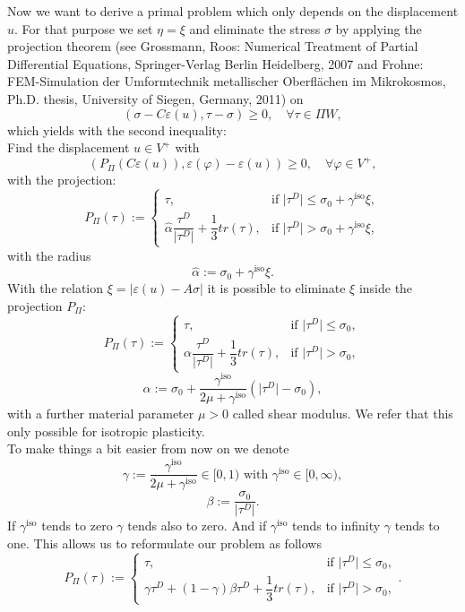\documentclass{article}
\begin{document}
Now we want to derive a primal problem which only depends on the displacement $u$. For that purpose we
set $\eta = \xi$ and eliminate the stress $\sigma$ by applying the projection
theorem (see Grossmann, Roos: Numerical Treatment of Partial Differential
Equations, Springer-Verlag Berlin Heidelberg, 2007 and Frohne: FEM-Simulation
der Umformtechnik metallischer Oberflächen im Mikrokosmos, Ph.D. thesis,
University of Siegen, Germany, 2011) on\\
$$\left(\sigma - C\varepsilon(u), \tau - \sigma\right) \geq 0,\quad \forall \tau\in \Pi W,$$
which yields with the second inequality:\\
Find the displacement $u\in V^+$ with
$$\left(P_{\Pi}(C\varepsilon(u)),\varepsilon(\varphi) - \varepsilon(u)\right) \geq 0,\quad \forall \varphi\in V^+,$$
with the projection:
$$P_{\Pi}(\tau):=\begin{cases}
			\tau, & \text{if }\vert\tau^D\vert \leq \sigma_0 +  \gamma^{\text{iso}}\xi,\\
			\hat\alpha\dfrac{\tau^D}{\vert\tau^D\vert} + \dfrac{1}{3}tr(\tau), & \text{if }\vert\tau^D\vert > \sigma_0 +  \gamma^{\text{iso}}\xi,
			\end{cases}$$
with the radius
$$\hat\alpha := \sigma_0 + \gamma^{\text{iso}}\xi .$$
With the relation $\xi = \vert\varepsilon(u) - A\sigma\vert$ it is possible to eliminate $\xi$ inside the projection $P_{\Pi}$:\\
$$P_{\Pi}(\tau):=\begin{cases}
			\tau, & \text{if }\vert\tau^D\vert \leq \sigma_0,\\
			\alpha\dfrac{\tau^D}{\vert\tau^D\vert} + \dfrac{1}{3}tr(\tau), & \text{if }\vert\tau^D\vert > \sigma_0,
			\end{cases}$$
$$\alpha := \sigma_0 + \dfrac{\gamma^{\text{iso}}}{2\mu+\gamma^{\text{iso}}}\left(\vert\tau^D\vert - \sigma_0\right) ,$$
with a further material parameter $\mu>0$ called shear modulus. We refer that
this only possible for isotropic plasticity.\\
To make things a bit easier from now on we denote
$$\gamma := \dfrac{\gamma^{\text{iso}}}{2\mu +
\gamma^{\text{iso}}}\in[0,1)\text{ with }\gamma^{\text{iso}}\in[0,\infty),$$
$$\beta :=\dfrac{\sigma_0}{\vert\tau^D\vert}.$$ If $\gamma^{\text{iso}}$ tends to zero $\gamma$ tends also to zero. And if $\gamma^{\text{iso}}$ tends to
infinity $\gamma$ tends to one. This allows us to reformulate our problem as
follows $$P_{\Pi}(\tau):=\begin{cases}
                        \tau, & \text{if }\vert\tau^D\vert \leq \sigma_0,\\
                        \gamma\tau^D + (1-\gamma)\beta\tau^D
                        + \dfrac{1}{3}tr(\tau), & \text{if }\vert\tau^D\vert >
                        \sigma_0, \end{cases}.$$
\end{document}
